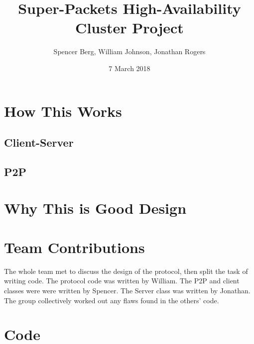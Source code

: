 \documentclass[11pt]{article}
\title{Super-Packets High-Availability Cluster Project}
\author{Spencer Berg, William Johnson, Jonathan Rogers}
\date{7 March 2018}
\begin{document}
\maketitle

\thispagestyle{empty}

\begin{doublespace}
\section{How This Works}

\subsection{Client-Server}



\subsection{P2P}



\section{Why This is Good Design}



\section{Team Contributions}

The whole team met to discuss the design of the protocol, then split the task of writing code.
The protocol code was written by William.
The P2P and client classes were were written by Spencer.
The Server class was written by Jonathan.
The group collectively worked out any flaws found in the others' code.

\section{Code}
\end{doublespace}
\end{document}
